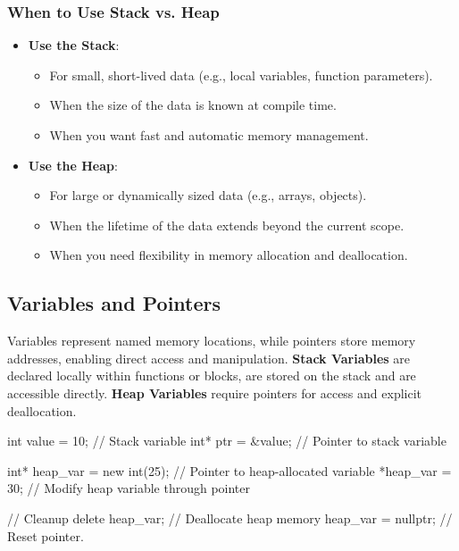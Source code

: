 \subsubsection{When to Use Stack vs. Heap}

\begin{itemize}
    \item \textbf{Use the Stack}:
    \begin{itemize}
        \item For small, short-lived data (e.g., local variables, function parameters).
        \item When the size of the data is known at compile time.
        \item When you want fast and automatic memory management.
    \end{itemize}
    \item \textbf{Use the Heap}:
    \begin{itemize}
        \item For large or dynamically sized data (e.g., arrays, objects).
        \item When the lifetime of the data extends beyond the current scope.
        \item When you need flexibility in memory allocation and deallocation.
    \end{itemize}
\end{itemize}

\subsection{Variables and Pointers}

Variables represent named memory locations, while pointers store memory addresses, enabling direct access and manipulation.
\textbf{Stack Variables} are declared locally within functions or blocks, are stored on the stack and are accessible directly.
\textbf{Heap Variables} require pointers for access and explicit deallocation.

\begin{exampleblock}
    \begin{codeblock}[language=C++]
int value = 10;       // Stack variable
int* ptr = &value;    // Pointer to stack variable

int* heap_var = new int(25); // Pointer to heap-allocated variable
*heap_var = 30;       // Modify heap variable through pointer

// Cleanup
delete heap_var;      // Deallocate heap memory
heap_var = nullptr;   // Reset pointer.
    \end{codeblock}
\end{exampleblock}

